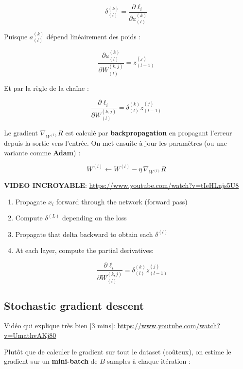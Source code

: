 \documentclass[11pt,a4paper,openany]{book}
\begin{document}
\[
\delta^{(k)}_{(l)}
=
\frac{\partial \ell_i}
{\partial a^{(k)}_{(l)}}
\]

Puisque $a^{(k)}_{(l)}$ dépend linéairement des poids :

\[
\frac{\partial a^{(k)}_{(l)}}
{\partial W^{(k,j)}_{(l)}}
=
z^{(j)}_{(l-1)}
\]

Et par la règle de la chaîne :

\[
\frac{\partial \ell_i}
{\partial W^{(k,j)}_{(l)}}
=
\delta^{(k)}_{(l)}
z^{(j)}_{(l-1)}
\]

Le gradient $\nabla_{W^{(l)}} R$ est calculé par \textbf{backpropagation} en propagant l'erreur depuis la sortie vers l'entrée. On met ensuite à jour les paramètres (ou une variante comme \textbf{Adam}) :

\[
W^{(l)} \leftarrow W^{(l)} - \eta \, \nabla_{W^{(l)}} R
\]

\textbf{VIDEO INCROYABLE}: \url{https://www.youtube.com/watch?v=tIeHLnjs5U8}

\bigskip

\begin{algbox}[title=Back propagation]
\begin{enumerate}
    \item Propagate $x_i$ forward through the network (forward pass)

    \item Compute $\delta^{(L)}$ depending on the loss

    \item Propagate that delta backward to obtain each $\delta^{(l)}$

    \item At each layer, compute the partial derivatives:

    \[
    \frac{
    \partial \ell_i
    }{
    \partial W_{(l)}^{(k,j)}
    }
    =
    \delta_{(l)}^{(k)}
    z_{(l-1)}^{(j)}
    \]
\end{enumerate}
\end{algbox}

\subsection{Stochastic gradient descent}

Vidéo qui explique très bien [3 mins]: \url{https://www.youtube.com/watch?v=UmathvAKj80}

Plutôt que de calculer le gradient sur tout le dataset (coûteux), on estime le gradient sur un \textbf{mini-batch} de $B$ samples à chaque itération :
\end{document}
